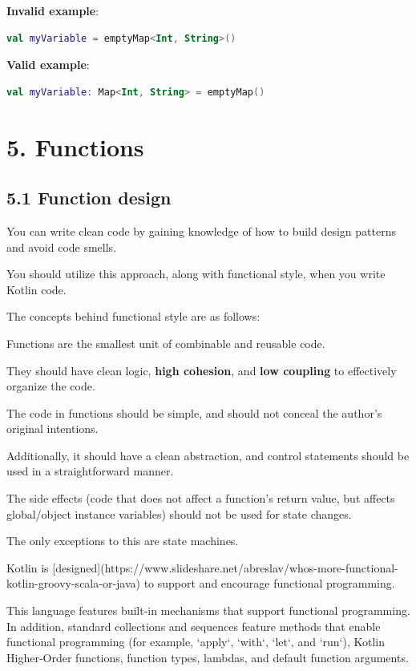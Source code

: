 {{{{\textbf{Invalid example}:

\begin{lstlisting}[language=Kotlin]
val myVariable = emptyMap<Int, String>()
\end{lstlisting}


\textbf{Valid example}:

\begin{lstlisting}[language=Kotlin]
val myVariable: Map<Int, String> = emptyMap()
\end{lstlisting}
\section*{\textbf{5. Functions}}

\subsection*{\textbf{5.1 Function design}}

You can write clean code by gaining knowledge of how to build design patterns and avoid code smells.

You should utilize this approach, along with functional style, when you write Kotlin code.

The concepts behind functional style are as follows:

Functions are the smallest unit of combinable and reusable code.

They should have clean logic, \textbf{high cohesion}, and \textbf{low coupling} to effectively organize the code.

The code in functions should be simple, and should not conceal the author's original intentions.

Additionally, it should have a clean abstraction, and control statements should be used in a straightforward manner.

The side effects (code that does not affect a function's return value, but affects global/object instance variables) should not be used for state changes.

The only exceptions to this are state machines.



Kotlin is [designed](https://www.slideshare.net/abreslav/whos-more-functional-kotlin-groovy-scala-or-java) to support and encourage functional programming.

This language features built-in mechanisms that support functional programming. In addition, standard collections and sequences feature methods that enable functional programming (for example, `apply`, `with`, `let`, and `run`), Kotlin Higher-Order functions, function types, lambdas, and default function arguments.

}}}}
